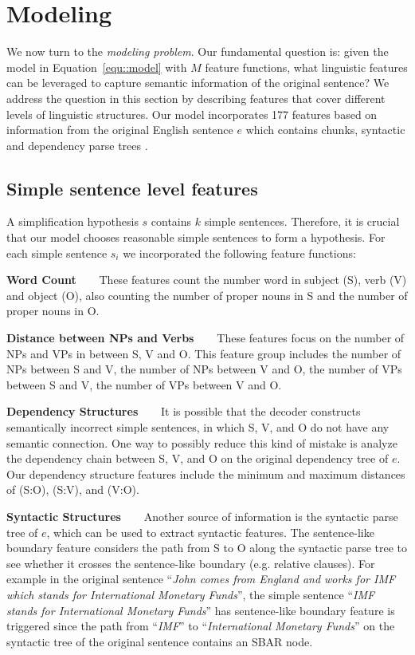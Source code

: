 \documentclass[10pt]{article}
\begin{document}
\section{Modeling}
\label{sec:Modeling}

We now turn to the \textit{modeling problem}.
Our fundamental question is: given the model in Equation~\ref{equ::model} with $M$ feature functions, what linguistic features can be leveraged to capture semantic information of the original sentence?
We address the question in this section by describing features that cover different levels of linguistic structures.
Our model incorporates 177 features based on information from the original English sentence $e$ which contains chunks, syntactic and dependency parse trees \cite{Ramshaw95,StanfordDepParser:2006}.

\subsection{Simple sentence level features}

A simplification hypothesis $s$ contains $k$ simple sentences.
Therefore, it is crucial that our model chooses reasonable simple sentences to form a hypothesis.
For each simple sentence $s_i$ we incorporated the following feature functions:

\textbf{Word Count\ \ \ } These features count the number word in subject (S), verb (V) and object (O), also counting the number of proper nouns in S and the number of proper nouns in O.

\textbf{Distance between NPs and Verbs\ \ \ } These features focus on the number of NPs and VPs in between S, V and O.
This feature group includes the number of NPs between S and V, the number of NPs between V and O,  the number of VPs between S and V, the number of VPs between V and O.

\textbf{Dependency Structures\ \ \ } It is possible that the decoder constructs semantically incorrect simple sentences, in which S, V, and O do not have any semantic connection.
One way to possibly reduce this kind of mistake is analyze the dependency chain between S, V, and O on the original dependency tree of $e$.
Our dependency structure features include the minimum and maximum distances of (S:O), (S:V), and (V:O). 

\textbf{Syntactic Structures\ \ \ } Another source of information is the syntactic parse tree of $e$, which can be used to extract syntactic features.
The sentence-like boundary feature considers the path from S to O along the syntactic parse tree to see whether it crosses the sentence-like boundary (e.g. relative clauses).
For example in the original sentence ``\textit{John comes from England and works for IMF which stands for International Monetary Funds}'', the simple sentence ``\textit{IMF stands for International Monetary Funds}'' has sentence-like boundary feature is triggered since the path from ``\textit{IMF}'' to ``\textit{International Monetary Funds}'' on the syntactic tree of the original sentence contains an SBAR node.
\end{document}
